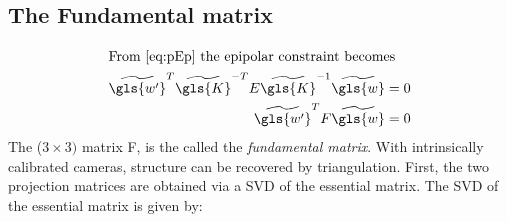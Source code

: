 \subsection{The Fundamental matrix}

\begin{align}
    \intertext{From~\eqref{eq:pEp} the epipolar constraint becomes}
    \widetilde{\gls{w'}} ^T \widetilde{\gls{K}}^{-T} E \widetilde{\gls{K}}^{-1} \widetilde{\gls{w}}  &= 0 \\
    \widetilde{\gls{w'}} ^T F \widetilde{\gls{w}}  &= 0
\end{align}
The (\(3\times3)\) matrix \gls{F}, is the called the \emph{fundamental matrix}.
With intrinsically calibrated cameras, structure can be recovered by triangulation.
First, the two projection matrices are obtained via a \gls{SVD} of the essential matrix.
The \gls{SVD} of the essential matrix is given by:

